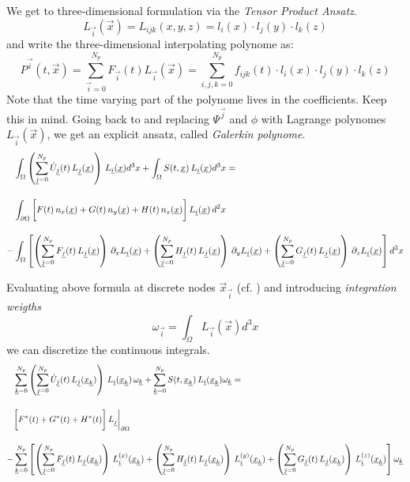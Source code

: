 We get to three-dimensional formulation via the \emph{Tensor Product Ansatz}.
\newcommand{\LI}{L_{\vec{i}}(\vec{x})}
\begin{equation}
\label{eq-tensor-ansatz}
    \LI = L_{ijk}(x,y,z) = l_i(x) \cdot l_j(y) \cdot l_k(z)
\end{equation}
and write the three-dimensional interpolating polynome as:
\newcommand{\PI}{P^{\vec{i}}(t,\vec{x})}
\newcommand{\FI}{F_{\vec{i}}(t)}
\newcommand{\sumI}{\sum^{N_p}_{\vec{i}=0}}
\begin{equation}
\label{eq-tensor-ansatz}
    \PI = \sumI \FI \LI = \sum^{N_p}_{i,j,k = 0} f_{ijk}(t) \cdot l_i(x) \cdot l_j(y) \cdot l_k(z)
\end{equation}
Note that the time varying part of the polynome lives in the coefficients.
Keep this in mind.
\newcommand{\FJ}{F_{\vec{j}}(t)}
\newcommand{\GJ}{G_{\vec{j}}(t)}
\newcommand{\HJ}{H_{\vec{j}}(t)}
\newcommand{\STX}{S(t,\vec{x})}
\newcommand{\UJ}{ \dot{U}_{\vec{j}}(t)}
\newcommand{\LJ}{L_{\vec{j}}(\vec{x})}
\newcommand{\sumJ}{\sum^{N_p}_{\vec{j}=0}}
\newcommand{\nx}{n_x(\vec{x})}
\newcommand{\ny}{n_y(\vec{x})}
\newcommand{\nz}{n_z(\vec{x})}
Going back to  and replacing $\Psi^{\vec{j}}$
and $\phi$ with Lagrange polynomes $\LI$, we get an explicit ansatz, called
\emph{Galerkin polynome}.
\begin{align}
     &\int_\Omega \left(\sumJ \UJ \, \LJ \right) \, \LI d^3x + \int_\Omega \STX \, \LI d^3x = \nonumber \br
     &\int_{\partial\Omega} \bigg[ F(t) \, \nx + G(t) \, \ny + H(t)\, \nz \bigg]\,\LI\, d^2x \br
    -&\int_\Omega \left[
          \left(\sumJ \FJ \, \LJ \right) \, \partial_x \LI 
        + \left(\sumJ \HJ \, \LJ \right) \, \partial_y \LI
        + \left(\sumJ \GJ \, \LJ \right) \, \partial_z \LI \right] d^3x \nonumber
\end{align}

\newcommand{\sumK}{\sum^{N_p}_{\vec{k}=0}}
\newcommand{\wK}{\omega_{\vec{k}}}

\newcommand{\STXK}{S(t,\vec{x}_{\vec{k}})}
\newcommand{\LIK}{L_{\vec{i}}(\vec{x}_{\vec{k}})}
\newcommand{\LJK}{L_{\vec{j}}(\vec{x}_{\vec{k}})}

\newcommand{\LXIK}{L^{(x)}_{\vec{i}}(\vec{x}_{\vec{k}})}
\newcommand{\LYIK}{L^{(y)}_{\vec{i}}(\vec{x}_{\vec{k}})}
\newcommand{\LZIK}{L^{(z)}_{\vec{i}}(\vec{x}_{\vec{k}})}

Evaluating above formula at discrete nodes $\vec{x}_{\vec{i}}$ (cf.
) and introducing \emph{integration weigths}
\begin{equation}
\label{eqn:mass-matrix}
    \omega_{\vec{i}} = \int_{\Omega} \LI d^3 x
\end{equation}
we can discretize the continuous integrals.
\begin{align}
     &\sumK \left(\sumJ \UJ \, \LJK \right) \, \LIK \,\wK + \sumK \STXK \, \LIK \wK = \nonumber \br
     &\bigg[ F^*(t) + G^*(t) + H^*(t)\bigg] \, L_{\vec{j}}\bigg|_{\partial\Omega} \br
    -&\sumK \left[
          \left(\sumJ \FJ \, \LJK \right) \, \LXIK 
        + \left(\sumJ \HJ \, \LJK \right) \, \LYIK
        + \left(\sumJ \GJ \, \LJK \right) \, \LZIK \right] \wK \nonumber
\end{align}

